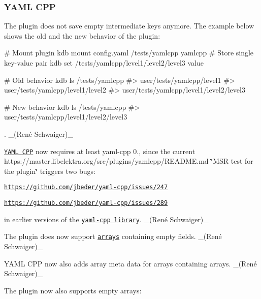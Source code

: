 \subsubsection*{Y\+A\+ML C\+PP}


\begin{DoxyItemize}
\item The plugin does not save empty intermediate keys anymore. The example below shows the old and the new behavior of the plugin\+:
\end{DoxyItemize}


\begin{DoxyCode}
# Mount plugin
kdb mount config.yaml /tests/yamlcpp yamlcpp
# Store single key-value pair
kdb set /tests/yamlcpp/level1/level2/level3 value

# Old behavior
kdb ls /tests/yamlcpp
#> user/tests/yamlcpp/level1
#> user/tests/yamlcpp/level1/level2
#> user/tests/yamlcpp/level1/level2/level3

# New behavior
kdb ls /tests/yamlcpp
#> user/tests/yamlcpp/level1/level2/level3
\end{DoxyCode}


. \+\_\+(René Schwaiger)\+\_\+


\begin{DoxyItemize}
\item \href{http://libelektra.org/plugins/yamlcpp}{\tt Y\+A\+ML C\+PP} now requires at least {\ttfamily yaml-\/cpp 0.}, since the current https\+://master.libelektra.\+org/src/plugins/yamlcpp/\+R\+E\+A\+D\+ME.md \char`\"{}\+M\+S\+R test for the plugin\char`\"{} triggers two bugs\+:
\begin{DoxyItemize}
\item \href{https://github.com/jbeder/yaml-cpp/issues/247}{\tt https\+://github.\+com/jbeder/yaml-\/cpp/issues/247}
\item \href{https://github.com/jbeder/yaml-cpp/issues/289}{\tt https\+://github.\+com/jbeder/yaml-\/cpp/issues/289}
\end{DoxyItemize}

in earlier versions of the \href{https://github.com/jbeder/yaml-cpp}{\tt yaml-\/cpp library}. \+\_\+(René Schwaiger)\+\_\+
\item The plugin does now support \href{https://www.libelektra.org/tutorials/arrays}{\tt arrays} containing empty fields. \+\_\+(René Schwaiger)\+\_\+
\item Y\+A\+ML C\+PP now also adds {\ttfamily array} meta data for arrays containing arrays. \+\_\+(René Schwaiger)\+\_\+
\item The plugin now also supports empty arrays\+:
\end{DoxyItemize}


